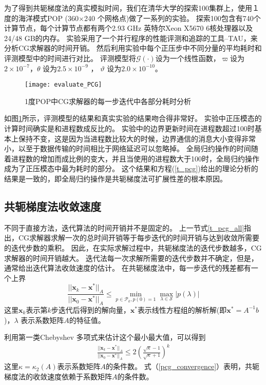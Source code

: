  
为了得到共轭梯度法的真实模拟时间，我们在清华大学的探索100集群上，使用１度的海洋模式POP (360$\times$240 个网格点)做了一系列的实验。 
探索100包含有740个计算节点，每个计算节点都有两个2.93 GHz 英特尔Xeon X5670 6核处理器以及24/48 GB的内存。 
实验采用了一个并行程序的性能评测和追踪的工具--TAU\cite{shende2006tau}，来分析CG求解器的时间开销。 
然后利用实验中每个正压步中不同分量的平均耗时和评测模型中的时间进行对比。 
评测模型将$\mathcal{G}(\cdot)$设为一个线性函数，$\varpi$设为 $2\times 10^{-7}$，$\theta$ 设为$2.5\times 10^{-9}$ ， $\vartheta$ 设为$2.0\times 10^{-10}$。 


\begin{figure}[ht]
\centering
\texttt{[image: evaluate\_PCG]}
\caption[] {1度POP中CG求解器的每一步迭代中各部分耗时分析\label{fig:pcg_ratio}}
\end{figure}
如图\ref{fig:pcg_ratio}所示，评测模型的结果和真实实验的结果吻合得非常好。 
实验中正压模态的计算时间确实是和进程数成反比的。 
实验中的边界更新时间在进程数超过100时基本上保持不变，这是因为当进程数比较大的时候，边界通信的消息大小变得非常小，以至于数据传输的时间相比于网络延迟可以忽略掉。 
全局归约操作的时间随着进程数的增加而成比例的变大，并且当使用的进程数大于100时，全局归约操作成为了正压模态中最为耗时的部分。 
这个结果和方程(\ref{t_pcg})给出的理论分析的结果是一致的，即全局归约操作是共轭梯度法可扩展性差的根本原因。 

\subsection{共轭梯度法收敛速度} \label{solver:CG:convergence_rate}

不同于直接方法，迭代算法的时间开销并不是固定的。
上一节式\ref{t_pcg_all}指出，CG求解器求解一次的总时间开销等于每步迭代的时间开销与达到收敛所需要的迭代步数的乘积。
因此，在实际求解过程中，共轭梯度法的迭代步数越多，CG求解器的时间开销越大。 
迭代法每一次求解所需要的迭代步数并不确定，但是，通常给出迭代算法收敛速度的估计。
在共轭梯度法中，每一步迭代的残差都有一个上界\cite{Liesen2004}
\begin{equation}
\frac{||\textbf{x}_k-\textbf{x}^*||_A }{||\textbf{x}_0-\textbf{x}^*||_A}  \le \min_{p\in \mathcal{P}_k, p(0) = 1 }\max_{\lambda \in \mathcal{S}} |p(\lambda)| \label{PcgConvergeRate}
\end{equation}
这里$\textbf{x}_k$表示第$k$步迭代后得到的解向量，$\textbf{x}^*$表示线性方程组的解析解(即$\textbf{x}^* = A^{-1}b$)，$\lambda$ 表示系数矩阵$A$的特征值。

利用第一类Chebyshev 多项式来估计这个最小最大值，可以得到 
\begin{align}
\label{pcg_convergence}
\frac{||\textbf{x}_k-\textbf{x}^*||_A}{||\textbf{x}_0-\textbf{x}^*||_A}\le  2 (\frac{\sqrt{\kappa}-1}{\sqrt{\kappa}+1})^k
\end{align}
这里$\kappa =  \kappa_2(A)$表示系数矩阵$A$的条件数。
式（\ref{pcg_convergence}）表明，共轭梯度法的收敛速度依赖于系数矩阵$A$的条件数。

